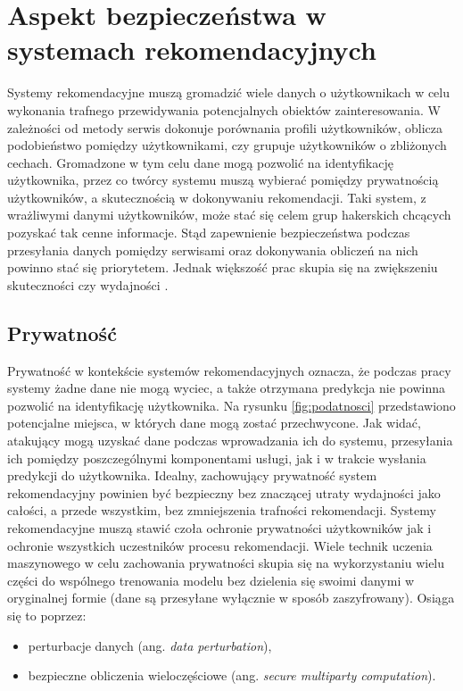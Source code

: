 \chapter{Aspekt bezpieczeństwa w systemach rekomendacyjnych}
Systemy rekomendacyjne muszą gromadzić wiele danych o użytkownikach w celu wykonania trafnego przewidywania potencjalnych obiektów zainteresowania. W zależności od metody serwis dokonuje porównania  profili użytkowników, oblicza podobieństwo pomiędzy użytkownikami, czy grupuje użytkowników o zbliżonych cechach. Gromadzone w tym celu dane mogą pozwolić na identyfikację użytkownika, przez co twórcy systemu muszą wybierać pomiędzy prywatnością użytkowników, a skutecznością w dokonywaniu rekomendacji. Taki system, z wrażliwymi danymi użytkowników, może stać się celem grup hakerskich chcących pozyskać tak cenne informacje. Stąd zapewnienie bezpieczeństwa podczas przesyłania danych pomiędzy serwisami oraz dokonywania obliczeń na nich powinno stać się priorytetem. Jednak większość prac skupia się na zwiększeniu skuteczności czy wydajności \cite{recent_developments}.

\section{Prywatność}
Prywatność w kontekście systemów rekomendacyjnych oznacza, że podczas pracy systemy żadne dane nie mogą wyciec, a także otrzymana predykcja nie powinna pozwolić na identyfikację użytkownika. Na rysunku \ref{fig:podatnosci} przedstawiono potencjalne miejsca, w których dane mogą zostać przechwycone. Jak widać, atakujący mogą uzyskać dane podczas wprowadzania ich do systemu, przesyłania ich pomiędzy poszczególnymi komponentami usługi, jak i w trakcie wysłania predykcji do użytkownika. Idealny, zachowujący prywatność system rekomendacyjny powinien być bezpieczny bez znaczącej utraty wydajności jako całości, a przede wszystkim, bez zmniejszenia trafności rekomendacji. Systemy rekomendacyjne muszą stawić czoła ochronie prywatności użytkowników jak i ochronie wszystkich uczestników procesu rekomendacji. Wiele technik uczenia maszynowego w celu zachowania prywatności skupia się na wykorzystaniu wielu części do wspólnego trenowania modelu bez dzielenia się swoimi danymi w oryginalnej formie (dane są przesyłane wyłącznie w sposób zaszyfrowany). Osiąga się to poprzez:
\begin{itemize}
    \item perturbacje danych (ang. \textit{data perturbation}),
    \item bezpieczne obliczenia wieloczęściowe (ang. \textit{secure multiparty computation}).
\end{itemize}

